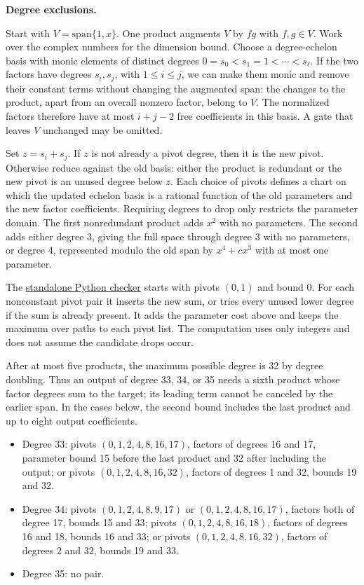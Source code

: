 \documentclass[11pt,a4paper]{article}
\providecommand{\tightlist}{\setlength{\itemsep}{0pt}\setlength{\parskip}{0pt}}
\begin{document}
\textbf{Degree exclusions.}

Start with \(V=\mathrm{span}\{1,x\}\). One product augments \(V\) by
\(fg\) with \(f,g\in V\). Work over the complex numbers for the
dimension bound. Choose a degree-echelon basis with monic elements of
distinct degrees \(0=s_0< s_1=1< \cdots< s_\ell\). If the two factors
have degrees \(s_i,s_j\), with \(1\le i\le j\), we can make them monic
and remove their constant terms without changing the augmented span: the
changes to the product, apart from an overall nonzero factor, belong to
\(V\). The normalized factors therefore have at most \(i+j-2\) free
coefficients in this basis. A gate that leaves \(V\) unchanged may be
omitted.

Set \(z=s_i+s_j\). If \(z\) is not already a pivot degree, then it is
the new pivot. Otherwise reduce against the old basis: either the
product is redundant or the new pivot is an unused degree below \(z\).
Each choice of pivots defines a chart on which the updated echelon basis
is a rational function of the old parameters and the new factor
coefficients. Requiring degrees to drop only restricts the parameter
domain. The first nonredundant product adds \(x^2\) with no parameters.
The second adds either degree 3, giving the full space through degree 3
with no parameters, or degree 4, represented modulo the old span by
\(x^4+c x^3\) with at most one parameter.

The
\href{https://github.com/ajt60gaibb/OpenProblemsInNLA/blob/main/references/mf25-six-product-bound/check_degree_bounds.py}{standalone
Python checker} starts with pivots \((0,1)\) and bound 0. For each
nonconstant pivot pair it inserts the new sum, or tries every unused
lower degree if the sum is already present. It adds the parameter cost
above and keeps the maximum over paths to each pivot list. The
computation uses only integers and does not assume the candidate drops
occur.

After at most five products, the maximum possible degree is 32 by degree
doubling. Thus an output of degree 33, 34, or 35 needs a sixth product
whose factor degrees sum to the target; its leading term cannot be
canceled by the earlier span. In the cases below, the second bound
includes the last product and up to eight output coefficients.

\begin{itemize}
\tightlist
\item
  Degree 33: pivots \((0,1,2,4,8,16,17)\), factors of degrees 16 and 17,
  parameter bound 15 before the last product and 32 after including the
  output; or pivots \((0,1,2,4,8,16,32)\), factors of degrees 1 and 32,
  bounds 19 and 32.
\item
  Degree 34: pivots \((0,1,2,4,8,9,17)\) or \((0,1,2,4,8,16,17)\),
  factors both of degree 17, bounds 15 and 33; pivots
  \((0,1,2,4,8,16,18)\), factors of degrees 16 and 18, bounds 16 and 33;
  or pivots \((0,1,2,4,8,16,32)\), factors of degrees 2 and 32, bounds
  19 and 33.
\item
  Degree 35: no pair.
\end{itemize}
\end{document}
